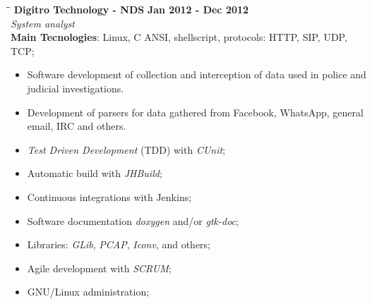\documentclass[margin]{res}
\begin{document}
\begin{resume}
   \begin{tabbing}
   \hspace{2.3in}\= \hspace{1.7in}\= \kill %
    \textbf{Digitro Technology - NDS}    \>\>\textbf{Jan 2012 - Dec 2012}\\
    \textit{System analyst}\\   
    \textbf{Main Tecnologies}: Linux, C ANSI, shellscript, protocols: HTTP, SIP, UDP, TCP;
   \end{tabbing}\vspace{-20pt}      %
    \vspace{5mm}
    \begin{itemize}
     \item Software development of collection and interception of data used in police and judicial investigations.
     \item Development of parsers for data gathered from Facebook, WhatsApp, general email, IRC and others.
     \item \textit{Test Driven Development} (TDD) with \textit{CUnit};
     \item Automatic build with \textit{JHBuild};
     \item Continuous integrations with Jenkins;
     \item Software documentation \textit{doxygen} and/or \textit{gtk-doc};
     \item Libraries: \textit{GLib}, \textit{PCAP}, \textit{Iconv}, and others;
     \item Agile development with \textit{SCRUM};
     \item GNU/Linux administration;
    \end{itemize}
 

\end{resume}
\end{document}
